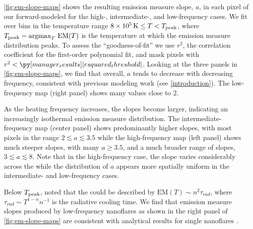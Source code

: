 \autoref{fig:em-slope-maps} shows the resulting emission measure slope, $a$, in each pixel of our forward-modeled \AR{} for the high-, intermediate-, and low-frequency cases. We fit \dem{} over bins in the temperature range $8\times10^{5}\,\textup{K}\le T< T_\textup{peak}$, where $T_\textup{peak}=\operatorname*{argmax}_T\,\mathrm{EM}(T)$ is the temperature at which the emission measure distribution peaks. To assess the ``goodness-of-fit'' we use $r^2$, the correlation coefficient for the first-order polynomial fit, and mask pixels with $r^2<\py[manager_results]|rsquared_threshold|$. Looking at the three panels in \autoref{fig:em-slope-maps}, we find that overall, $a$ tends to decrease with decreasing frequency, consistent with previous modeling work (see \autoref{introduction}). The low-frequency map (right panel) shows many values close to 2.

As the heating frequency increases, the slopes become larger, indicating an increasingly isothermal emission measure distribution. The intermediate-frequency map (center panel) shows predominantly higher slopes, with most pixels in the range $2\lesssim a \lesssim 3.5$ while the high-frequency map (left panel) shows much steeper slopes, with many $a\ge3.5$, and a much broader range of slopes, $3\lesssim a \lesssim 8$. Note that in the high-frequency case, the slope varies considerably across the \AR{} while the distribution of $a$ appears more spatially uniform in the intermediate- and low-frequency cases.

Below $T_\textup{peak}$, \citet{cargill_implications_1994} noted that the \dem{} could be described by $\mathrm{EM}(T)\sim n^2\tau_{rad}$, where $\tau_{rad}\sim T^{1-\alpha}n^{-1}$ is the radiative cooling time.   We find that emission measure slopes produced by low-frequency nanoflares as shown in the right panel of \autoref{fig:em-slope-maps} are  consistent with analytical results for single nanoflares . 

